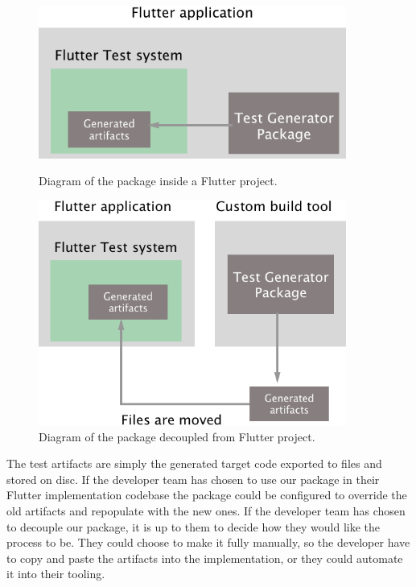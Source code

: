 \begin{figure}[H]
    \centering
    \begin{minipage}{0.45\textwidth}
        \centering
        \includegraphics[width=0.9\textwidth]{images/Embedded-in-flutter.png}
        \caption{Diagram of the package inside a Flutter project.}
        \label{package_in_futter}
    \end{minipage}\hfill
    \begin{minipage}{0.45\textwidth}
        \centering
        \includegraphics[width=0.9\textwidth]{images/Decoupled-from-flutter.png}
        \caption{Diagram of the package decoupled from Flutter project.}
        \label{package_outside_flutter}
    \end{minipage}
\end{figure}

The test artifacts are simply the generated target code exported to files and stored on disc. 
If the developer team has chosen to use our package in their Flutter implementation codebase the package could be configured to override the old artifacts and repopulate with the new ones.
If the developer team has chosen to decouple our package, it is up to them to decide how they would like the process to be.
They could choose to make it fully manually, so the developer have to copy and paste the artifacts into the implementation, or they could automate it into their tooling.

